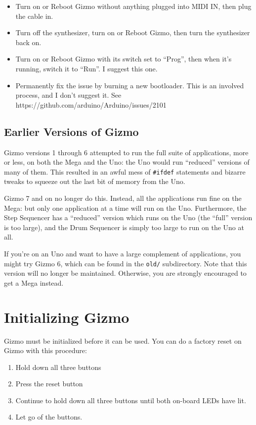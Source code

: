 \documentclass{article}
\begin{document}
\begin{itemize}
\item Turn on or Reboot Gizmo without anything plugged into MIDI IN, then plug the cable in.
\item Turn off the synthesizer, turn on or Reboot Gizmo, then turn the synthesizer back on.
\item Turn on or Reboot Gizmo with its switch set to ``Prog'', then when it's running, switch it to ``Run''.  I suggest this one.
\item Permanently fix the issue by burning a new bootloader.  This is an involved process, and I don't suggest it.  See https:/\!/github.com/arduino/Arduino/issues/2101
\end{itemize}

\subsection{Earlier Versions of Gizmo}

Gizmo versions 1 through 6 attempted to run the full suite of applications, more or less, on both the Mega and the Uno: the Uno would run ``reduced'' versions of many of them.  This resulted in an awful mess of {\tt \#ifdef} statements and bizarre tweaks to squeeze out the last bit of memory from the Uno.

Gizmo 7 and on no longer do this.  Instead, all the applications run fine on the Mega: but only one application at a time will run on the Uno.  Furthermore, the Step Sequencer has a ``reduced'' version which runs on the Uno (the ``full'' version is too large), and the Drum Sequencer is simply too large to run on the Uno at all.

If you're on an Uno and want to have a large complement of applications, you might try Gizmo 6, which can be found in the {\tt old/} subdirectory.  Note that this version will no longer be maintained.  Otherwise, you are strongly encouraged to get a Mega instead.

\clearpage
\section{Initializing Gizmo}
\label{initializinggizmo}

Gizmo must be initialized before it can be used.  You can do a factory reset on Gizmo with this procedure:

\begin{enumerate}
\item Hold down all three buttons
\item Press the reset button
\item Continue to hold down all three buttons until both on-board LEDs have lit.
\item Let go of the buttons.
\end{enumerate}
\end{document}
